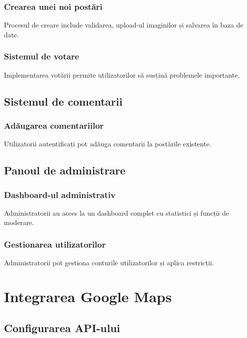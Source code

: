 \documentclass[12pt,a4paper]{report}
\begin{document}
\subsubsection{Crearea unei noi postări}

Procesul de creare include validarea, upload-ul imaginilor și salvarea în baza de date.

\subsubsection{Sistemul de votare}

Implementarea votării permite utilizatorilor să susțină problemele importante.

\subsection{Sistemul de comentarii}

\subsubsection{Adăugarea comentariilor}

Utilizatorii autentificați pot adăuga comentarii la postările existente.

\subsection{Panoul de administrare}

\subsubsection{Dashboard-ul administrativ}

Administratorii au acces la un dashboard complet cu statistici și funcții de moderare.

\subsubsection{Gestionarea utilizatorilor}

Administratorii pot gestiona conturile utilizatorilor și aplica restricții.

\section{Integrarea Google Maps}

\subsection{Configurarea API-ului}
\end{document}
